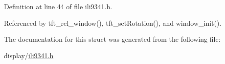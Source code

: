 Definition at line 44 of file ili9341.\-h.



Referenced by tft\-\_\-rel\-\_\-window(), tft\-\_\-set\-Rotation(), and window\-\_\-init().



The documentation for this struct was generated from the following file\-:\begin{DoxyCompactItemize}
\item 
display/\hyperlink{ili9341_8h}{ili9341.\-h}\end{DoxyCompactItemize}
